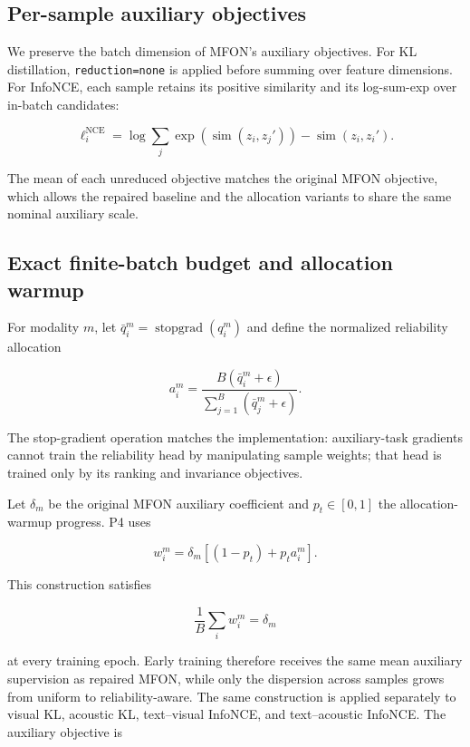 \subsection{Per-sample auxiliary
objectives}\label{per-sample-auxiliary-objectives}

We preserve the batch dimension of MFON's auxiliary objectives. For KL
distillation,
\texttt{reduction=\textquotesingle{}none\textquotesingle{}} is applied
before summing over feature dimensions. For InfoNCE, each sample retains
its positive similarity and its log-sum-exp over in-batch candidates:

\[
\ell^{\mathrm{NCE}}_i=
\log\sum_j\exp(\operatorname{sim}(z_i,z_j'))
-\operatorname{sim}(z_i,z_i').
\]

The mean of each unreduced objective matches the original MFON
objective, which allows the repaired baseline and the allocation
variants to share the same nominal auxiliary scale.

\subsection{Exact finite-batch budget and allocation
warmup}\label{exact-finite-batch-budget-and-allocation-warmup}

For modality \(m\), let
\(\bar q_i^m=\operatorname{stopgrad}(q_i^m)\) and define the normalized
reliability allocation

\[
a_i^m=
\frac{B(\bar q_i^m+\epsilon)}{\sum_{j=1}^{B}(\bar q_j^m+\epsilon)}.
\]

The stop-gradient operation matches the implementation: auxiliary-task
gradients cannot train the reliability head by manipulating sample weights;
that head is trained only by its ranking and invariance objectives.

Let \(\delta_m\) be the original MFON auxiliary coefficient and
\(p_t\in[0,1]\) the allocation-warmup progress. P4 uses

\[
w_i^m=\delta_m\left[(1-p_t)+p_t a_i^m\right].
\]

This construction satisfies

\[
\frac{1}{B}\sum_i w_i^m=\delta_m
\]

at every training epoch. Early training therefore receives the same mean
auxiliary supervision as repaired MFON, while only the dispersion across
samples grows from uniform to reliability-aware. The same construction
is applied separately to visual KL, acoustic KL, text--visual InfoNCE,
and text--acoustic InfoNCE. The auxiliary objective is

